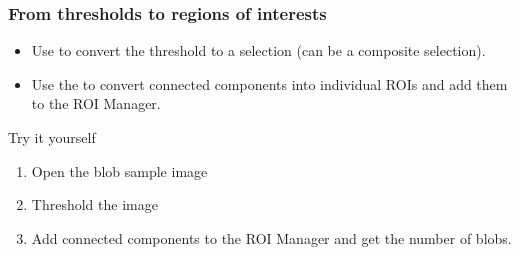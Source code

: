 \documentclass[ignorenonframetext,aspectratio=169,10pt,xcolor=table]{beamer}
\begin{document}
\begin{frame} \frametitle{From thresholds to regions of interests}
  \begin{itemize}
  \item Use  to convert the
    threshold to a selection (can be a composite selection).
  \item Use the  to convert
    connected components into individual ROIs and add them to the ROI
    Manager.
  \end{itemize}
  \begin{block}{Try it yourself}
    \begin{enumerate}
    \item Open the blob sample image
    \item Threshold the image
    \item Add connected components to the ROI Manager and get the
      number of blobs.
    \end{enumerate}
  \end{block}
\end{frame}
\end{document}
